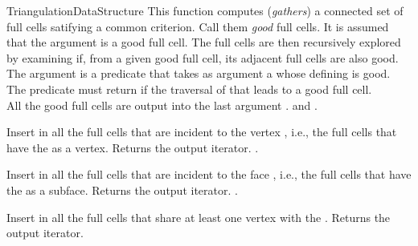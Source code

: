 \begin{ccRefConcept}{TriangulationDataStructure}
{This function computes (\emph{gathers}) a connected set of full cells
satifying a common criterion. Call them \emph{good} full cells. It is assumed
that the argument  is a good full cell. The full cells are then
recursively explored by examining if, from a given good full cell, its adjacent
full cells are also good.\\
The argument  is a predicate that takes as argument a 
whose defining  is good. The predicate must return 
if the traversal of that  leads to a good full cell.\\
All the good full cells are output into the last argument .
\ccPrecond {} and .
}

{Insert in  all the full cells that are incident to the vertex
, {i.e.}, the full cells that have the  as a vertex.
Returns the output iterator.
\ccPrecond {}.
}

{Insert in  all the full cells that are incident to the face ,
{i.e.}, the full cells that have the  as a subface.
Returns the output iterator.
\ccPrecond{}.
}

{Insert in  all the full cells that share at least one vertex with the . Returns the output iterator.
}




\end{ccRefConcept}
